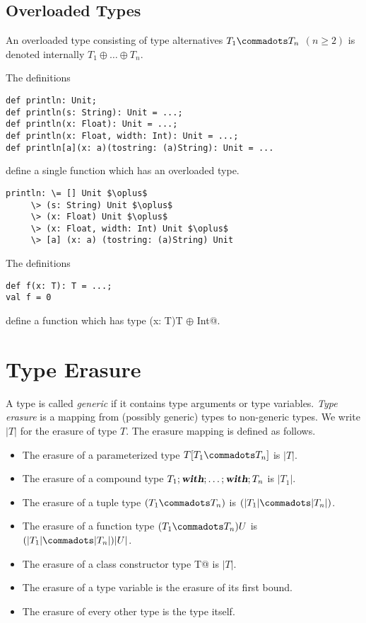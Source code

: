 \documentclass[11pt]{report}
\begin{document}
\subsection{Overloaded Types}
\label{sec:overloaded-types}

An overloaded type consisting of type alternatives $T_1 \commadots
T_n$ $(n \geq 2)$ is denoted internally $T_1 \oplus \ldots \oplus
T_n$.

\example The definitions
\begin{verbatim}
def println: Unit;
def println(s: String): Unit = ...;
def println(x: Float): Unit = ...;
def println(x: Float, width: Int): Unit = ...;
def println[a](x: a)(tostring: (a)String): Unit = ...
\end{verbatim}
define a single function \verb@println@ which has an overloaded
type.
\begin{verbatim}
println: \= [] Unit $\oplus$
	 \> (s: String) Unit $\oplus$
	 \> (x: Float) Unit $\oplus$
	 \> (x: Float, width: Int) Unit $\oplus$
	 \> [a] (x: a) (tostring: (a)String) Unit
\end{verbatim}

\example The definitions
\begin{verbatim}
def f(x: T): T = ...;
val f = 0
\end{verbatim}
define a function \verb@f@ which has type \verb@(x: T)T $\oplus$ Int@.

\section{Type Erasure}
\label{sec:erasure}

A type is called {\em generic} if it contains type arguments or type variables.
{\em Type erasure} is a mapping from (possibly generic) types to
non-generic types. We write $|T|$ for the erasure of type $T$.
The erasure mapping is defined as follows.
\begin{itemize}
\item The erasure of a parameterized type $T[T_1 \commadots T_n]$ is $|T|$.
\item The erasure of a compound type $T_1;\mbox{\sl\bfseries with};\ldots;\mbox{\sl\bfseries with};T_n$ is $|T_1|$.
\item The erasure of a tuple type $(T_1 \commadots T_n)$ is $(|T_1| \commadots |T_n|)$.
\item The erasure of a function type $(T_1 \commadots T_n)U$ is
$(|T_1| \commadots |T_n|)|U|$.
\item The erasure of a class constructor type \verb@class T@ is $|T|$.
\item The erasure of a type variable is the erasure of its first bound.
\item The erasure of every other type is the type itself.
\end{itemize}
\end{document}
